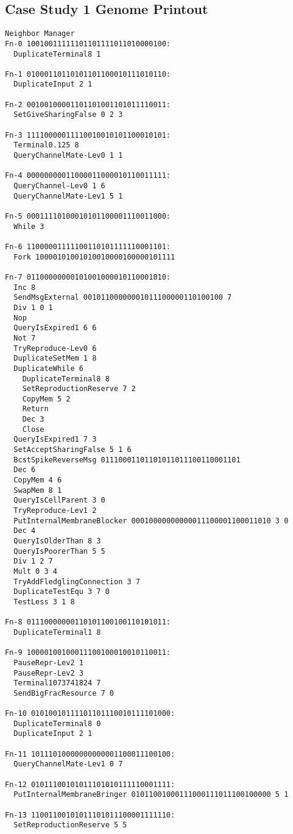 \subsection{Case Study 1 Genome Printout}

\begin{verbatim}
Neighbor Manager
Fn-0 10010011111101101111011010000100:
  DuplicateTerminal8 1

Fn-1 01000110110101101100010111010110:
  DuplicateInput 2 1

Fn-2 00100100001101101001101011110011:
  SetGiveSharingFalse 0 2 3

Fn-3 11110000011110010010101100010101:
  Terminal0.125 8
  QueryChannelMate-Lev0 1 1

Fn-4 00000000011000011000010110011111:
  QueryChannel-Lev0 1 6
  QueryChannelMate-Lev1 5 1

Fn-5 00011110100010101100001110011000:
  While 3

Fn-6 11000001111100110101111110001101:
  Fork 10000101001010010000100000101111

Fn-7 01100000000101001000010110001010:
  Inc 8
  SendMsgExternal 00101100000001011100000110100100 7
  Div 1 0 1
  Nop
  QueryIsExpired1 6 6
  Not 7
  TryReproduce-Lev0 6
  DuplicateSetMem 1 8
  DuplicateWhile 6
    DuplicateTerminal8 8
    SetReproductionReserve 7 2
    CopyMem 5 2
    Return
    Dec 3
    Close
  QueryIsExpired1 7 3
  SetAcceptSharingFalse 5 1 6
  BcstSpikeReverseMsg 01110001101101011011100110001101
  Dec 6
  CopyMem 4 6
  SwapMem 8 1
  QueryIsCellParent 3 0
  TryReproduce-Lev1 2
  PutInternalMembraneBlocker 00010000000000011100001100011010 3 0
  Dec 4
  QueryIsOlderThan 8 3
  QueryIsPoorerThan 5 5
  Div 1 2 7
  Mult 0 3 4
  TryAddFledglingConnection 3 7
  DuplicateTestEqu 3 7 0
  TestLess 3 1 8

Fn-8 01110000000110101100100110101011:
  DuplicateTerminal1 8

Fn-9 10000100100011100100010010110011:
  PauseRepr-Lev2 1
  PauseRepr-Lev2 3
  Terminal1073741824 7
  SendBigFracResource 7 0

Fn-10 01010010111101101110010111101000:
  DuplicateTerminal8 0
  DuplicateInput 2 1

Fn-11 10111010000000000001100011100100:
  QueryChannelMate-Lev1 0 7

Fn-12 01011100101011101010111110001111:
  PutInternalMembraneBringer 01011001000111000111011100100000 5 1

Fn-13 11001100101011101011100001111110:
  SetReproductionReserve 5 5


\end{verbatim}
